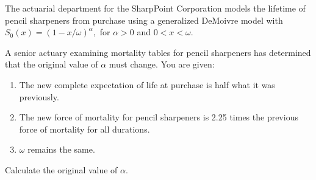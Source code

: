 The actuarial department for the SharpPoint Corporation models the lifetime of pencil
sharpeners from purchase using a generalized DeMoivre model with 
\( S_0(x) = (1-x/\omega)^{\alpha},\) for $\alpha>0$ and $0<x<\omega$. 

\smallskip
A senior actuary examining mortality tables for pencil sharpeners has determined that the
original value of $\alpha$ must change. You are given:
\begin{enumerate}
  \item The new complete expectation of life at purchase is half what it was previously.
  \item The new force of mortality for pencil sharpeners is 2.25 times the previous force of mortality for all durations.
  \item $\omega$ remains the same.
\end{enumerate}
Calculate the original value of $\alpha$. 

